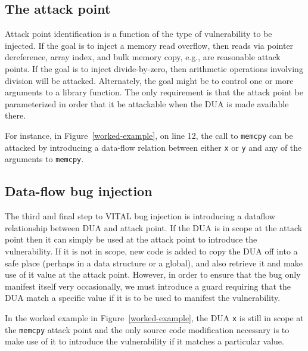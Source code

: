 \subsection {The attack point}

Attack point identification is a function of the type of vulnerability to be injected.
If the goal is to inject a memory read overflow, then reads via pointer dereference, array index, and bulk memory copy, e.g., are reasonable attack points.  
If the goal is to inject divide-by-zero, then arithmetic operations involving division will be attacked. 
Alternately, the goal might be to control one or more arguments to a library function.
The only requirement is that the attack point be parameterized in order that it be attackable when the DUA is made available there. 

For instance, in Figure~\ref{worked-example}, on line 12, the call to \verb+memcpy+ can be attacked by introducing a data-flow relation between either \verb+x+ or \verb+y+ 
and any of the arguments to \verb+memcpy+.

\subsection {Data-flow bug injection}

The third and final step to VITAL bug injection is introducing a dataflow relationship between DUA and attack point.  
If the DUA is in scope at the attack point then it can simply be used at the attack point to introduce the vulnerability.
If it is not in scope, new code is added to copy the DUA off into a safe place (perhaps in a data structure or a global), and also retrieve it and  make use of it value at the attack point. 
However, in order to ensure that the bug only manifest itself very occasionally, we must introduce a guard requiring that the DUA match a specific value if it is to be used to manifest the vulnerability.

In the worked example in Figure~\ref{worked-example}, the DUA \verb+x+ is still in scope at the \verb+memcpy+ attack point and
 the only source code modification necessary is to make use of it to introduce the vulnerability if it matches a particular value.  









